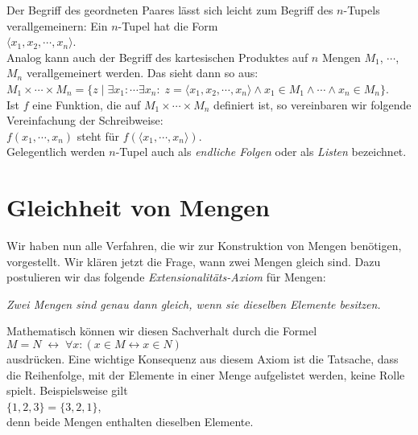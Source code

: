 Der Begriff des geordneten Paares l\"{a}sst sich leicht zum Begriff des $n$-Tupels verallgemeinern:
Ein $n$-Tupel hat die Form \\[0.2cm]
\hspace*{1.3cm} $\langle x_1, x_2, \cdots, x_n \rangle$. \\[0.2cm]
Analog kann auch der Begriff des kartesischen Produktes auf $n$ Mengen $M_1$, $\cdots$, $M_n$
verallgemeinert werden. Das sieht dann so aus: \\[0.2cm]
\hspace*{1.3cm} $M_1 \times \cdots \times M_n =\big\{ z \mid \exists x_1\colon
\cdots \exists x_n \colon \; z = \langle x_1,x_2,\cdots,x_n \rangle \wedge x_1
\in M_1 \wedge \cdots \wedge x_n \in M_n \big\}$. \\[0.2cm]
Ist $f$ eine Funktion, die auf $M_1 \times \cdots \times M_n$ definiert ist,
so vereinbaren wir folgende Vereinfachung der Schreibweise: \\[0.2cm]
\hspace*{1.3cm} $f(x_1, \cdots, x_n)$ steht f\"{u}r $f(\langle x_1, \cdots,
x_n\rangle)$. \\[0.2cm]
Gelegentlich werden $n$-Tupel auch als \emph{endliche Folgen} oder als
\emph{Listen} bezeichnet.  

\section{Gleichheit von Mengen}
Wir haben nun alle Verfahren, die wir zur Konstruktion von Mengen ben\"{o}tigen, vorgestellt.
 Wir kl\"{a}ren jetzt die Frage, wann zwei Mengen gleich sind.  Dazu
postulieren wir das folgende \emph{Extensionalit\"{a}ts-Axiom} f\"{u}r Mengen: 
\begin{center}
 {\sl Zwei Mengen sind genau dann gleich, wenn sie dieselben Elemente besitzen.}
\end{center}
Mathematisch k\"{o}nnen wir diesen Sachverhalt durch die Formel
\\[0.2cm]
\hspace*{1.3cm} $M = N \;\leftrightarrow\; \forall x: (x \in M \leftrightarrow x \in N)$ 
\\[0.2cm]
ausdr\"{u}cken.  Eine wichtige Konsequenz aus diesem Axiom ist die Tatsache, dass die Reihenfolge, mit der
Elemente in einer Menge aufgelistet werden, keine Rolle spielt.  Beispielsweise gilt \\[0.2cm]
\hspace*{1.3cm} $\{1,2,3\} = \{3,2,1\}$, \\[0.2cm]
denn beide Mengen enthalten dieselben Elemente.

